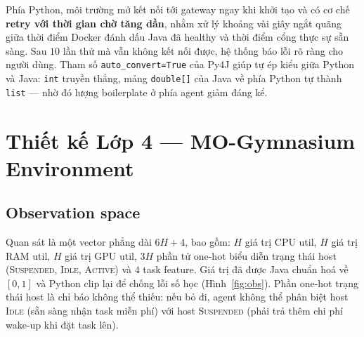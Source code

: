 Phía Python, môi trường mở kết nối tới gateway ngay khi khởi tạo và
có cơ chế \textbf{retry với thời gian chờ tăng dần}, nhằm xử lý
khoảng vài giây ngắt quãng giữa thời điểm Docker đánh dấu Java đã
healthy và thời điểm cổng thực sự sẵn sàng. Sau $10$ lần thử mà vẫn
không kết nối được, hệ thống báo lỗi rõ ràng cho người dùng. Tham số
\texttt{auto\_convert=True} của Py4J giúp tự ép kiểu giữa Python và
Java: \texttt{int} truyền thẳng, mảng \texttt{double[]} của Java về
phía Python tự thành \texttt{list} --- nhờ đó lượng boilerplate ở phía
agent giảm đáng kể.

\section{Thiết kế Lớp 4 — MO-Gymnasium Environment}
\label{sec:layer-mogym}

\subsection{Observation space}
\label{ssec:obs-space}
Quan sát là một vector phẳng dài $6H + 4$, bao gồm: $H$ giá trị CPU
util, $H$ giá trị RAM util, $H$ giá trị GPU util, $3H$ phần tử one-hot
biểu diễn trạng thái host (\textsc{Suspended}, \textsc{Idle},
\textsc{Active}) và $4$ task feature. Giá trị đã được Java chuẩn hoá
về $[0,1]$ và Python clip lại để chống lỗi số học
(Hình~\ref{fig:obs}). Phần one-hot trạng thái host là chỉ báo không
thể thiếu: nếu bỏ đi, agent không thể phân biệt host \textsc{Idle}
(sẵn sàng nhận task miễn phí) với host \textsc{Suspended} (phải trả
thêm chi phí wake-up khi đặt task lên).

